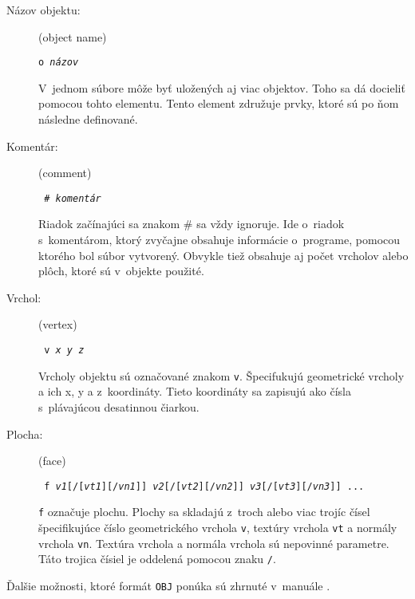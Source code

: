 \begin{description}
\item[Názov objektu:] (object name)

{\color[HTML]{991212}\texttt{o \textit{názov}}}


V~jednom súbore môže byť uložených aj viac objektov. Toho sa dá docieliť pomocou tohto elementu. Tento element združuje prvky, ktoré sú po ňom následne definované.

\item[Komentár:] (comment)

\texttt{\color[HTML]{991212} \# \textit{komentár}}

Riadok začínajúci sa znakom \# sa vždy ignoruje. Ide o~riadok s~komentárom, ktorý zvyčajne obsahuje informácie o~programe, pomocou ktorého bol súbor vytvorený. Obvykle tiež obsahuje aj počet vrcholov alebo plôch, ktoré sú v~objekte použité.

\item[Vrchol:] (vertex)

\texttt{\color[HTML]{991212}  v~\textit{x y z}}

Vrcholy objektu sú označované znakom {\tt v}. Špecifukujú geometrické vrcholy a ich x, y a z~koordináty. Tieto koordináty sa zapisujú ako čísla s~plávajúcou desatinnou čiarkou.

\item[Plocha:] (face)

\texttt{\color[HTML]{991212}  f 
\textit{v1}[/[\textit{vt1}][/\textit{vn1}]] 
\textit{v2}[/[\textit{vt2}][/\textit{vn2}]] 
\textit{v3}[/[\textit{vt3}][/\textit{vn3}]] ...}

{\tt f} označuje plochu.
Plochy sa skladajú z~troch alebo viac trojíc čísel špecifikujúce číslo geometrického vrchola {\tt v}, textúry vrchola {\tt vt} a normály vrchola {\tt vn}. 
Textúra vrchola a normála vrchola sú nepovinné parametre. Táto trojica čísiel je oddelená pomocou znaku {\tt /}.
\end{description}
Ďalšie možnosti, ktoré formát {\tt OBJ} ponúka sú zhrnuté v~manuále \cite{objmanual:1}.


